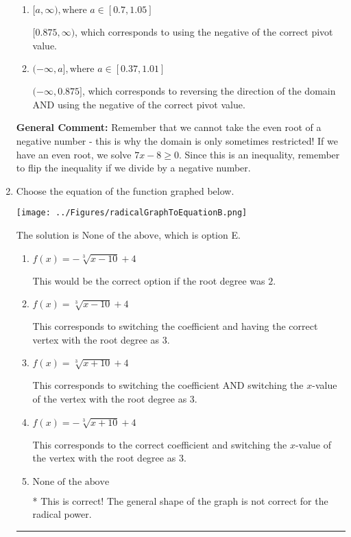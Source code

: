 \documentclass{extbook}[14pt]
\newcommand{\litem}[1]{\item #1

\rule{\textwidth}{0.4pt}}
\begin{document}
\begin{enumerate}
{\begin{enumerate}[label=\Alph*.]
* $[1.143, \infty)$, which is the correct option.
\item \( [a, \infty), \text{where } a \in [0.7, 1.05] \)

$[0.875, \infty)$, which corresponds to using the negative of the correct pivot value.
\item \( (-\infty, a], \text{where } a \in [0.37, 1.01] \)

$(-\infty, 0.875]$, which corresponds to reversing the direction of the domain AND using the negative of the correct pivot value.
\end{enumerate}

\textbf{General Comment:} Remember that we cannot take the even root of a negative number - this is why the domain is only sometimes restricted! If we have an even root, we solve $7 x - 8 \geq 0$. Since this is an inequality, remember to flip the inequality if we divide by a negative number.
}
\litem{
Choose the equation of the function graphed below.

\begin{center}
    \texttt{[image: ../Figures/radicalGraphToEquationB.png]}
\end{center}


The solution is \( \text{None of the above} \), which is option E.\begin{enumerate}[label=\Alph*.]
\item \( f(x) = - \sqrt[3]{x - 10} + 4 \)

This would be the correct option if the root degree was $2$.
\item \( f(x) = \sqrt[3]{x - 10} + 4 \)

This corresponds to switching the coefficient and having the correct vertex with the root degree as $3$.
\item \( f(x) = \sqrt[3]{x + 10} + 4 \)

This corresponds to switching the coefficient AND switching the $x$-value of the vertex with the root degree as $3$.
\item \( f(x) = - \sqrt[3]{x + 10} + 4 \)

This corresponds to the correct coefficient and switching the $x$-value of the vertex with the root degree as $3$.
\item \( \text{None of the above} \)

* This is correct! The general shape of the graph is not correct for the radical power.
\end{enumerate}

}
\end{enumerate}
\end{document}
